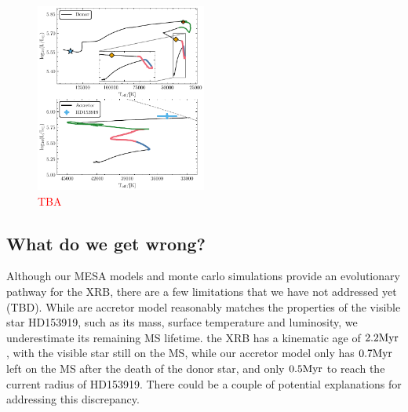 \documentclass[linenumbers,trackchanges,twocolumn]{aastex701}
\newcommand{\red}{\textcolor{red}}
\begin{document}
\begin{figure}[htbp]
    \centering
    \includegraphics[width=0.5\textwidth]{xrb_fiducial_hr.pdf}
    \caption{\red{TBA}}
    \label{fig:xrb_fiducial_hr}
\end{figure}

\subsection{What do we get wrong?}

Although our MESA models and monte carlo simulations provide an evolutionary pathway for the XRB, there are a few limitations that we have not addressed yet (TBD). While are accretor model reasonably matches the properties of the visible star HD153919, such as its mass, surface temperature and luminosity, we underestimate its remaining MS lifetime. the XRB has a kinematic age of $2.2\rm Myr$, with the visible star still on the MS, while our accretor model only has $0.7\rm Myr$ left on the MS after the death of the donor star, and only $0.5\rm Myr$ to reach the current radius of HD153919. There could be a couple of potential explanations for addressing this discrepancy.
\end{document}
